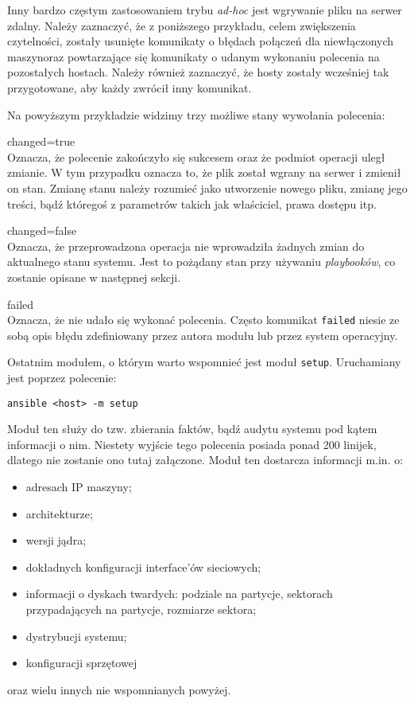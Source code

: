 Inny bardzo częstym zastosowaniem trybu \textit{ad-hoc} jest wgrywanie pliku na serwer zdalny.
Należy zaznaczyć, że z poniższego przykładu, celem zwiększenia czytelności, zostały usunięte komunikaty o błędach połączeń dla niewłączonych maszynoraz powtarzające się komunikaty o udanym wykonaniu polecenia na pozostałych hostach.
Należy również zaznaczyć, że hosty zostały wcześniej tak przygotowane, aby każdy zwrócił inny komunikat.

Na powyższym przykładzie widzimy trzy możliwe stany wywołania polecenia:
\begin{description}
	\item{changed=true}\\
		Oznacza, że polecenie zakończyło się sukcesem oraz że podmiot operacji uległ zmianie. W tym przypadku oznacza to, że plik został wgrany na serwer i zmienił on stan.
		Zmianę stanu należy rozumieć jako utworzenie nowego pliku, zmianę jego treści, bądź któregoś z parametrów takich jak właściciel, prawa dostępu itp.
	\item{changed=false}\\
		Oznacza, że przeprowadzona operacja nie wprowadziła żadnych zmian do aktualnego stanu systemu.
		Jest to pożądany stan przy używaniu \textit{playbooków}, co zostanie opisane w następnej sekcji.
	\item{failed}\\
		Oznacza, że nie udało się wykonać polecenia.
		Często komunikat \texttt{failed} niesie ze sobą opis błędu zdefiniowany przez autora modułu lub przez system operacyjny.
\end{description}
Ostatnim modułem, o którym warto wspomnieć jest moduł \texttt{setup}. Uruchamiany jest poprzez polecenie:
\begin{lstlisting}
ansible <host> -m setup
\end{lstlisting}
Moduł ten służy do tzw. zbierania faktów, bądź audytu systemu pod kątem informacji o nim.
Niestety wyjście tego polecenia posiada ponad 200 linijek, dlatego nie zostanie ono tutaj załączone.
Moduł ten dostarcza informacji m.in. o:
\begin{itemize}
	\item adresach IP maszyny;
	\item architekturze;
	\item wersji jądra;
	\item dokładnych konfiguracji interface'ów sieciowych;
	\item informacji o dyskach twardych: podziale na partycje, sektorach przypadających na partycje, rozmiarze sektora;
	\item dystrybucji systemu;
	\item konfiguracji sprzętowej
\end{itemize}
oraz wielu innych nie wspomnianych powyżej.
